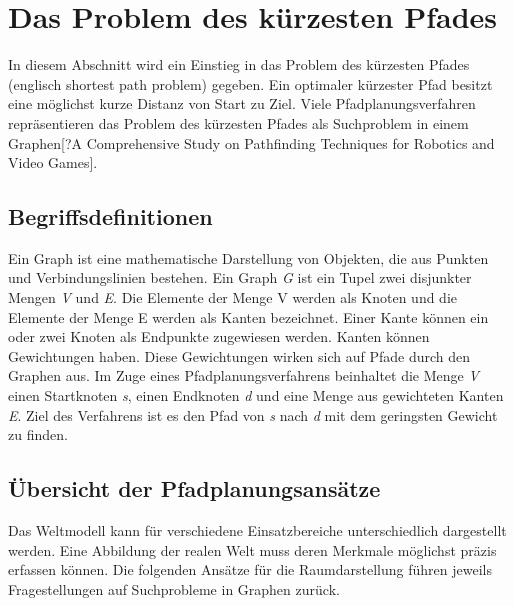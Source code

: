 \chapter{Das Problem des kürzesten Pfades}

In diesem Abschnitt wird ein Einstieg in das Problem des kürzesten Pfades (englisch shortest path problem) gegeben. Ein optimaler kürzester Pfad besitzt eine möglichst kurze Distanz von Start zu Ziel\cite{Madkour.2017}. Viele Pfadplanungsverfahren repräsentieren das Problem des kürzesten Pfades als Suchproblem in einem Graphen[?A Comprehensive Study on Pathfinding Techniques for Robotics and Video Games]. %

\section{Begriffsdefinitionen}

Ein Graph ist eine mathematische Darstellung von Objekten, die aus Punkten und Verbindungslinien bestehen. Ein Graph \textit{G} ist ein Tupel zwei disjunkter Mengen \textit{V} und \textit{E}. Die Elemente der Menge V werden als Knoten und die Elemente der Menge E werden als Kanten bezeichnet. Einer Kante können ein oder zwei Knoten als Endpunkte zugewiesen werden. Kanten können Gewichtungen haben. Diese Gewichtungen wirken sich auf Pfade durch den Graphen aus\cite{Gross.2004}. Im Zuge eines Pfadplanungsverfahrens beinhaltet die Menge \textit{V} einen Startknoten \textit{s}, einen Endknoten \textit{d} und eine Menge aus gewichteten Kanten \textit{E}. %
Ziel des Verfahrens ist es den Pfad von \textit{s} nach \textit{d} mit dem geringsten Gewicht zu finden\cite{Madkour.2017}. 

\section{Übersicht der Pfadplanungsansätze}
Das Weltmodell kann für verschiedene Einsatzbereiche unterschiedlich dargestellt werden. Eine Abbildung der realen Welt muss deren Merkmale möglichst präzis erfassen können. Die folgenden Ansätze für die Raumdarstellung führen jeweils Fragestellungen auf Suchprobleme in Graphen zurück. %

